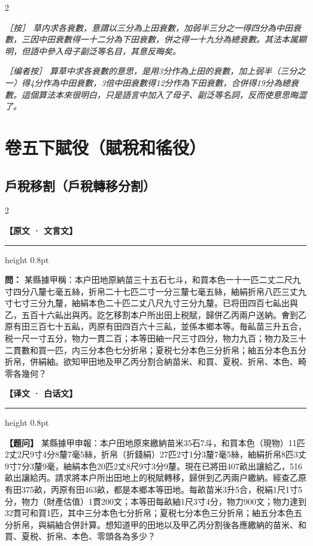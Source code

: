 \documentclass[11pt,a4paper]{article}
\newcommand{\ClassicalQuestion}[1]{\par\noindent\textbf{\color{problemcolor}問：}#1\par}
\newcommand{\ClassicalNote}[1]{\par\noindent\textit{［按］#1}\par}
\newcommand{\ModernQuestion}[1]{\par\noindent\textbf{\color{modernlabel}【题问】}#1\par}
\newcommand{\ModernNote}[1]{\par\noindent\textit{\color{notecolor}［编者按］#1}\par}
\newcommand{\ClassicalHeader}{%
  \begin{center}\textbf{\color{headerclassical}【原文 · 文言文】}\end{center}
  \vspace{-0.5em}
  \hrule height 0.8pt
  \vspace{0.5em}
}
\newcommand{\ModernHeader}{%
  \begin{center}\textbf{\color{headermodern}【译文 · 白话文】}\end{center}
  \vspace{-0.5em}
  \hrule height 0.8pt
  \vspace{0.5em}
}
\begin{document}
\begin{paracol}{2}

\ClassicalNote{%
草内求各衰數，意謂以三分為上田衰數，加弱半三分之一得四分為中田衰數，三因中田衰數得一十二分為下田衰數，併之得一十九分為總衰數。其法本属顯明，但語中參入母子副泛等名目，其意反晦矣。}

\switchcolumn

\ModernNote{%
算草中求各衰數的意思，是用3分作為上田的衰數，加上弱半（三分之一）得4分作為中田衰數，3倍中田衰數得12分作為下田衰數，合併得19分為總衰數。這個算法本來很明白，只是語言中加入了母子、副泛等名詞，反而使意思晦澀了。
}

\end{paracol}



\newpage
\section*{\color{titlecolor}卷五下\quad 賦役（賦稅和徭役）}

\subsection*{\color{sectioncolor}戶稅移割（戶稅轉移分割）}

\begin{paracol}{2}

\ClassicalHeader

\ClassicalQuestion{%
某縣據甲稱：本户田地原納苗三十五石七斗，和買本色一十一匹二丈二尺九寸四分八釐七毫五絲，折帛二十七匹二寸一分三釐七毫五絲，紬絹折帛八匹三丈九寸七寸三分九釐，紬絹本色二十匹二丈八尺九寸三分九釐。已将田四百七畆出與乙，五百十六畆出與丙。訖乞移割本户所出田上税賦，歸併乙丙兩户送納。㑹到乙原有田三百七十五畆，丙原有田四百六十三畆，並係本鄉本等。毎畆苗三升五合，税一尺一寸五分，物力一貫二百；本等田紬一尺三寸四分，物力九百；物力及三十二貫數和買一匹，内三分本色七分折帛；夏税七分本色三分折帛；紬五分本色五分折帛，併絹紬。欲知甲田地及甲乙丙分割合納苗米、和買、夏税、折帛、本色、畸零各幾何？}

\switchcolumn

\ModernHeader

\ModernQuestion{%
某縣據甲申報：本户田地原來繳納苗米35石7斗，和買本色（現物）11匹2丈2尺9寸4分8釐7毫5絲，折帛（折錢絹）27匹2寸1分3釐7毫5絲，紬絹折帛8匹3丈9寸7分3釐9毫，紬絹本色20匹2丈8尺9寸3分9釐。現在已將田407畝出讓給乙，516畝出讓給丙。請求將本户所出田地上的税賦轉移，歸併到乙丙兩户繳納。經查乙原有田375畝，丙原有田463畝，都是本鄉本等田地。每畝苗米3升5合，税絹1尺1寸5分，物力（財產估值）1貫200文；本等田每畝紬1尺3寸4分，物力900文；物力達到32貫可和買1匹，其中三分本色七分折帛；夏税七分本色三分折帛；紬五分本色五分折帛，與絹紬合併計算。想知道甲的田地以及甲乙丙分割後各應繳納的苗米、和買、夏税、折帛、本色、零頭各為多少？
}

\end{paracol}
\end{document}

